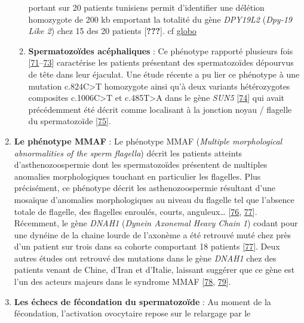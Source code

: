 \documentclass[12pt,twoside]{reedthesis}
\theoremstyle{definition}
\theoremstyle{definition}
\theoremstyle{remark}
\begin{document}
\begin{enumerate}
\begin{enumerate}
      portant sur 20 patients tunisiens permit d'identifier une délétion
      homozygote de 200 kb emportant la totalité du gène \emph{DPY19L2}
      (\emph{Dpy-19 Like 2}) chez 15 des 20 patients {[}{\textbf{???}}{]}.
      cf \protect\hyperlink{globo}{globo}\\
    \item
      \textbf{Spermatozoïdes acéphaliques} : Ce phénotype rapporté
      plusieurs fois
      {[}\protect\hyperlink{ref-Chemes2010}{71}--\protect\hyperlink{ref-Chemes1987}{73}{]}
      caractérise les patients présentant des spermatozoïdes dépourvus de
      tête dans leur éjaculat. Une étude récente a pu lier ce phénotype à
      une mutation c.824C\textgreater{}T homozygote ainsi qu'à deux
      variants hétérozygotes composites c.1006C\textgreater{}T et
      c.485T\textgreater{}A dans le gène \emph{SUN5}
      {[}\protect\hyperlink{ref-Zhu2016}{74}{]} qui avait précédemment été
      décrit comme localisant à la jonction noyau / flagelle du
      spermatozoïde {[}\protect\hyperlink{ref-Yassine2015}{75}{]}.
    \end{enumerate}
  \item
    \textbf{Le phénotype MMAF} : Le phénotype MMAF (\emph{Multiple
    morphological abnormalities of the sperm flagella}) décrit les
    patients atteints d'asthenozoospermie dont les spermatozoïdes
    présentent de multiples anomalies morphologiques touchant en
    particulier les flagelles. Plus précisément, ce phénotype décrit les
    asthenozoospermie résultant d'une mosaïque d'anomalies morphologiques
    au niveau du flagelle tel que l'absence totale de flagelle, des
    flagelles enroulés, courts, anguleux\ldots{}
    {[}\protect\hyperlink{ref-Coutton2015}{76},
    \protect\hyperlink{ref-BenKhelifa2014}{77}{]}. Récemment, le gène
    \emph{DNAH1} (\emph{Dynein Axonemal Heavy Chain 1}) codant pour une
    dynéine de la chaine lourde de l'axonème a été retrouvé muté chez près
    d'un patient sur trois dans sa cohorte comportant 18 patients
    {[}\protect\hyperlink{ref-BenKhelifa2014}{77}{]}. Deux autres études
    ont retrouvé des mutations dans le gène \emph{DNAH1} chez des patients
    venant de Chine, d'Iran et d'Italie, laissant suggérer que ce gène est
    l'un des acteurs majeurs dans le syndrome MMAF
    {[}\protect\hyperlink{ref-Wang2017}{78},
    \protect\hyperlink{ref-Amiri-Yekta2016}{79}{]}.
  \item
    \textbf{Les échecs de fécondation du spermatozoïde} : Au moment de la
    fécondation, l'activation ovocytaire repose sur le relargage par le

\end{enumerate}
\end{document}
